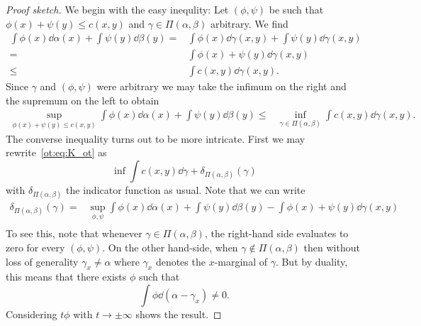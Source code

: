 \begin{proof}[Proof sketch]
    We begin with the easy inequlity: Let $(\phi,\psi)$ be such that $\phi(x) + \psi(y)\leq c(x,y)$ and $\gamma\in\Pi(\alpha,\beta)$ arbitrary. We find
    \begin{equation}
        \begin{aligned}
            \int \phi(x)\dd\alpha(x) + \int \psi(y)\dd \beta(y)
            =& \int \phi(x)\dd\gamma(x,y) + \int \psi(y)\dd \gamma(x,y)\\
            =& \int \phi(x)+\psi(y)\dd\gamma(x,y)\\
            \leq& \int c(x,y) \dd \gamma(x,y).
        \end{aligned}
    \end{equation}
    Since $\gamma$ and $(\phi,\psi)$ were arbitrary we may take the infimum on the right and the supremum on the left to obtain
    \begin{equation}
        \begin{aligned}
            \sup_{\phi(x)+\psi(y)\leq c(x,y)}\int \phi(x)\dd\alpha(x) + \int \psi(y)\dd \beta(y)
            \leq& \inf_{\gamma\in\Pi(\alpha,\beta)}\int c(x,y) \dd \gamma(x,y).
        \end{aligned}
    \end{equation}
    The converse inequality turns out to be more intricate.
    First we may rewrite~\eqref{ot:eq:K_ot} as 
    \begin{equation}
        \inf \int c(x,y)\dd \gamma + \delta_{\Pi(\alpha,\beta)}(\gamma)
    \end{equation}
    with $\delta_{\Pi(\alpha,\beta)}$ the indicator function as usual. Note that we can write
    \begin{equation}\label{ot:eq:duality}
        \begin{aligned}
            \delta_{\Pi(\alpha,\beta)}(\gamma)
            =& \sup_{\phi,\psi}\int \phi(x)\dd\alpha(x) + \int \psi(y)\dd \beta(y) - \int \phi(x)+\psi(y)\dd \gamma(x,y)\\
        \end{aligned}
    \end{equation}
    To see this, note that whenever $\gamma\in\Pi(\alpha,\beta)$, the right-hand side evaluates to zero for every $(\phi,\psi)$. On the other hand-side, when $\gamma\notin\Pi(\alpha,\beta)$ then without loss of generality $\gamma_x\neq \alpha$ where $\gamma_x$ denotes the $x$-marginal of $\gamma$. But by duality, this means that there exists $\phi$ such that
    \begin{equation}
        \int \phi \dd(\alpha - \gamma_x) \neq 0.
    \end{equation}
    Considering $t\phi$ with $t\rightarrow \pm \infty$ shows the result.


\end{proof}
